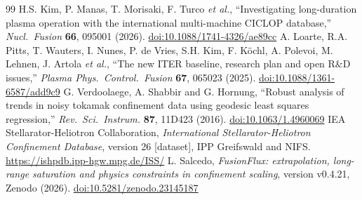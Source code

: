 \documentclass[aip,pop,preprint,amsmath,amssymb]{revtex4-2}
\begin{document}
\begin{thebibliography}{99}
H.S. Kim, P. Manas, T. Morisaki, F. Turco \emph{et al.},
``Investigating long-duration
plasma operation with the international multi-machine CICLOP database,''
\emph{Nucl.\ Fusion} \textbf{66}, 095001 (2026).
\href{https://doi.org/10.1088/1741-4326/ae89cc}{doi:10.1088/1741-4326/ae89cc}
 A. Loarte, R.A. Pitts, T. Wauters, I. Nunes, P. de Vries, S.H. Kim,
F. K\"{o}chl, A. Polevoi, M. Lehnen, J. Artola \emph{et al.},
``The new ITER baseline, research plan
and open R\&D issues,'' \emph{Plasma Phys.\ Control.\ Fusion} \textbf{67},
065023 (2025).
\href{https://doi.org/10.1088/1361-6587/add9c9}{doi:10.1088/1361-6587/add9c9}
 G. Verdoolaege, A. Shabbir and G. Hornung, ``Robust analysis of
trends in noisy tokamak confinement data using geodesic least squares
regression,'' \emph{Rev.\ Sci.\ Instrum.} \textbf{87}, 11D423 (2016).
\href{https://doi.org/10.1063/1.4960069}{doi:10.1063/1.4960069}
 IEA Stellarator-Heliotron Collaboration,
\emph{International Stellarator-Heliotron Confinement Database}, version 26
[dataset], IPP Greifswald and NIFS. \url{https://ishpdb.ipp-hgw.mpg.de/ISS/}
 L. Salcedo, \emph{FusionFlux: extrapolation, long-range
saturation and physics constraints in confinement scaling}, version v0.4.21,
Zenodo (2026).
\href{https://doi.org/10.5281/zenodo.23145187}{doi:10.5281/zenodo.23145187}
\end{thebibliography}
\end{document}
